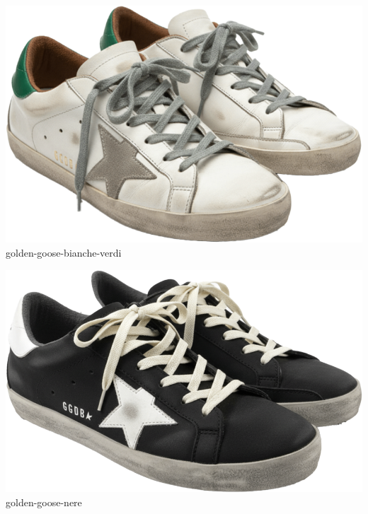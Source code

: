 \documentclass[10pt]{article}
\begin{document}
\begin{minipage}[t]{0.22\textwidth}\centering\vspace{0mm}
\includegraphics[width=\linewidth,keepaspectratio]{assets/shoes/golden-goose-bianche-verdi.png}\\
\vspace{0.5mm}\tiny golden-goose-bianche-verdi\end{minipage}
\begin{minipage}[t]{0.22\textwidth}\centering\vspace{0mm}
\includegraphics[width=\linewidth,keepaspectratio]{assets/shoes/golden-goose-nere.png}\\
\vspace{0.5mm}\tiny golden-goose-nere\end{minipage}
\
\vspace{2mm}\
\end{document}
